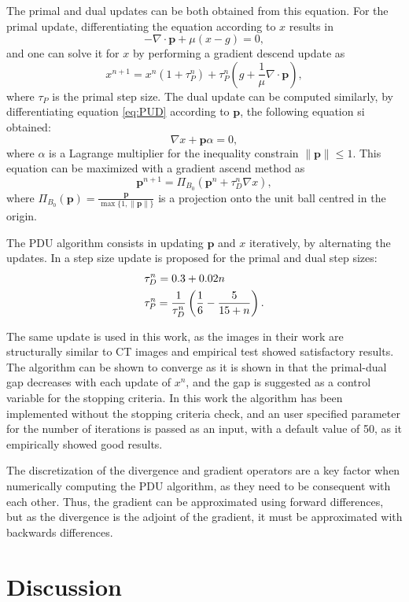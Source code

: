The primal and dual updates can be both obtained from this equation. For the primal update, differentiating the equation according to $x$ results in
\begin{equation}
- \nabla \cdot\textbf{p}+\mu(x-g)=0,
\end{equation}
and one can solve it for $x$ by performing a gradient descend update as
\begin{equation}
x^{n+1}=x^n(1+\tau_P^n)+\tau_P^n\left(g+\frac{1}{\mu} \nabla \cdot \textbf{p}\right),
\end{equation}
where $\tau_P$ is the primal step size. The dual update can be computed similarly, by differentiating equation \ref{eq:PUD} according to $\textbf{p}$, the following equation si obtained:
\begin{equation}
\nabla x+\textbf{p}\alpha=0,
\end{equation}
where $\alpha$ is a Lagrange multiplier for the inequality constrain $\lVert\textbf{p}\rVert\leq 1$. This equation can be maximized with a gradient ascend method as
\begin{equation}
\textbf{p}^{n+1}=\Pi_{B_0}\left(\textbf{p}^{n} +\tau_D^n\nabla x\right),
\end{equation}
where $\Pi_{B_0}(\textbf{p})=\frac{\textbf{p}}{\max\{1,\lVert\textbf{p}\rVert\}}$ is a projection onto the unit ball centred in the origin.

The PDU algorithm consists in updating $\textbf{p}$ and $x$ iteratively, by alternating the updates. In \cite{zhu2008efficient}\cite{knoll2010fast} a step size update is proposed for the primal and dual step sizes:
\begin{align}
&\tau_D^n=0.3+0.02n \notag \\
&\tau_P^n=\frac{1}{\tau_D^n}\left(\frac{1}{6}-\frac{5}{15+n}\right).
\end{align}

The same update is used in this work, as the images in their work are structurally similar to CT images and empirical test showed satisfactory results. The algorithm can be shown to converge as it is shown in \cite{zhu2010duality} that the primal-dual gap decreases with each update of $x^n$, and the gap is suggested as a control variable for the stopping criteria. In this work the algorithm has been implemented without the stopping criteria check, and an user specified parameter for the number of iterations is passed as an input, with a default value of 50, as it empirically showed good results.

The discretization of the divergence and gradient operators are a key factor when numerically computing the PDU algorithm, as they need to be consequent with each other. Thus, the gradient can be approximated using forward differences, but as the divergence is the adjoint of the gradient, it must be approximated with backwards differences.






\section{Discussion}
